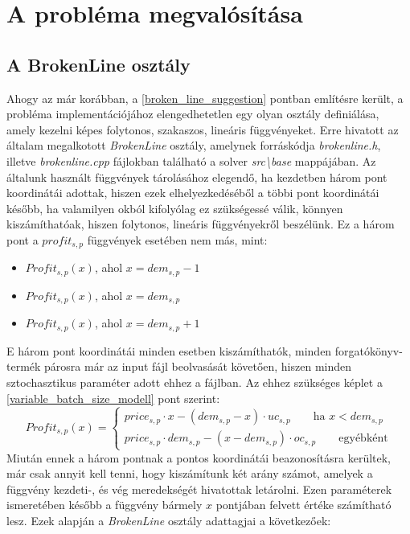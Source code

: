 \documentclass [12pt]{report}
\begin{document}
\chapter{A probléma megvalósítása}
\section{A BrokenLine osztály} \label{broken_line_class}
Ahogy az már korábban, a \ref{broken_line_suggestion} pontban említésre került, a probléma implementációjához elengedhetetlen egy olyan osztály definiálása, amely kezelni képes folytonos, szakaszos, lineáris függvényeket. Erre hivatott az általam megalkotott \textit{BrokenLine} osztály, amelynek forráskódja \textit{brokenline.h}, illetve \textit{brokenline.cpp} fájlokban található a solver \textit{src\textbackslash base} mappájában. Az általunk használt függvények tárolásához elegendő, ha kezdetben három pont koordinátái adottak, hiszen ezek elhelyezkedéséből a többi pont koordinátái később, ha valamilyen okból kifolyólag ez szükségessé válik, könnyen kiszámíthatóak, hiszen folytonos, lineáris függvényekről beszélünk. Ez a három pont a $profit_{s,p}$ függvények esetében nem más, mint: 
\begin{itemize}
\item $Profit_{s,p}(x)$\quad, ahol $x=dem_{s,p}-1$
\item $Profit_{s,p}(x)$\quad, ahol $x=dem_{s,p}$
\item $Profit_{s,p}(x)$\quad, ahol $x=dem_{s,p}+1$
\end{itemize} 
E három pont koordinátái minden esetben kiszámíthatók, minden forgatókönyv-termék párosra már az input fájl beolvasását követően, hiszen minden sztochasztikus paraméter adott ehhez a fájlban. Az ehhez szükséges képlet a \ref{variable_batch_size_modell} pont szerint:
\begin{equation*}
Profit_{s,p}(x)= \begin{cases}
            price_{s,p}\cdot x-(dem_{s,p}-x) \cdot uc_{s,p}\qquad \text{ha } x<dem_{s,p} \\
            price_{s,p} \cdot dem_{s,p}-(x-dem_{s,p}) \cdot oc_{s,p}\qquad \text{egyébként}
       \end{cases}
\end{equation*}
Miután ennek a három pontnak a pontos koordinátái beazonosításra kerültek, már csak annyit kell tenni, hogy kiszámítunk két arány számot, amelyek a függvény kezdeti-, és vég meredekségét hivatottak letárolni. Ezen paraméterek ismeretében később a függvény bármely $x$ pontjában felvett értéke számítható lesz. Ezek alapján a \textit{BrokenLine} osztály adattagjai a következőek:
\end{document}
